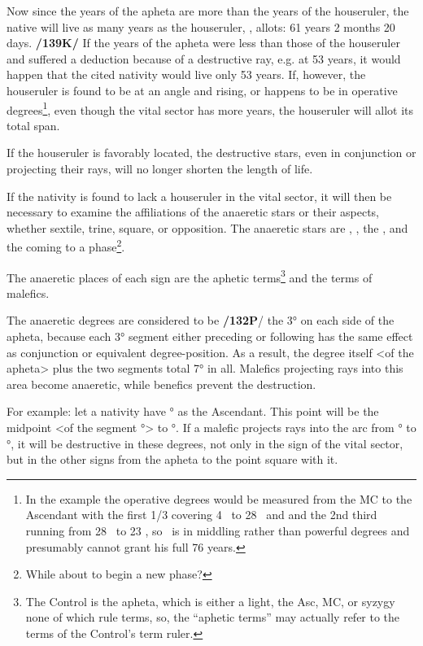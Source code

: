 Now since the years of the apheta are more than the years of the houseruler, the native will live as many years as the
houseruler, \Mercury, allots: 61 years 2 months 20 days. \textbf{/139K/} If the years of the apheta were less than
those of the houseruler and suffered a deduction because of a destructive ray, e.g. at 53 years, it would happen that the cited nativity would live only 53 years. If, however, the houseruler is found to be at an angle and rising, or happens to be in operative degrees\footnote{In the example the operative degrees would be measured from the MC to the Ascendant with the first 1/3 covering 4 \Libra\, to 28 \Libra\, and and the 2nd third running from 28 \Libra\, to 23 \Scorpio, so \Mercury\, is in middling rather than powerful degrees and presumably cannot grant his full 76 years.}, even though the vital sector has more years, the houseruler will allot its total span. 

If the houseruler is favorably located, the destructive stars, even in conjunction or projecting their rays, will no longer shorten the length of life. 

If the nativity is found to lack a houseruler in the vital sector, it will then be necessary to examine the affiliations of the anaeretic stars or their aspects, whether sextile, trine, square, or opposition. The  anaeretic stars are \Saturn, \Mars, the \Sun, and the \Moon\xspace coming to a phase\footnote{While about to begin a new phase?}. 

The  anaeretic places of each sign are the aphetic terms\footnote{The Control is the apheta, which is either a light, the Asc, MC, or syzygy none of which rule terms, so, the ``aphetic terms'' may actually refer to the terms of the Control's term ruler.} and the terms of malefics. 

The  anaeretic degrees are considered to be \textbf{/132P}/ the 3° on each side of the apheta, because each 3° segment either preceding or following has the same effect as conjunction or equivalent degree-position. As a result, the degree itself <of the apheta> plus the two segments total 7° in all. Malefics projecting rays into this area become anaeretic, while benefics prevent the destruction.

For example: let a nativity have \Aries\xspace 12° as the Ascendant. This point will be the midpoint <of the segment \Aries\xspace 9°> to \Aries\xspace 15°. If a malefic projects rays into the arc from \Aries\xspace 9° to \Aries\xspace 15°, it will be destructive in these degrees, not only in the sign of the vital sector, but in the other signs from the apheta
to the point square with it. 

